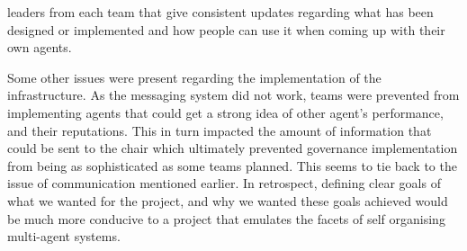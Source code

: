 leaders from each team that give consistent updates regarding what has been designed or implemented and how people can use it when coming up with their own agents.  

Some other issues were present regarding the implementation of the infrastructure. As the messaging system did not work, teams were prevented from implementing agents that could get a strong idea of other agent's performance, and their reputations. This in turn impacted the amount of information that could be sent to the chair which ultimately prevented governance implementation from being as sophisticated as some teams planned. This seems to tie back to the issue of communication mentioned earlier. In retrospect, defining clear goals of what we wanted for the project, and why we wanted these goals achieved would be much more conducive to a project that emulates the facets of self organising multi-agent systems.